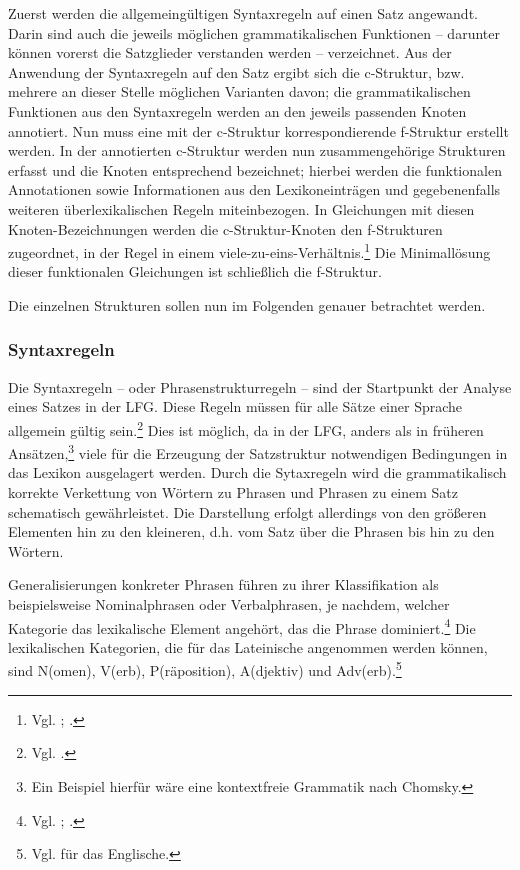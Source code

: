 \documentclass[12pt,a4paper]{article}
\begin{document}
Zuerst werden die allgemeingültigen Syntaxregeln auf einen Satz angewandt. Darin sind auch die jeweils möglichen grammatikalischen Funktionen -- darunter können vorerst die Satzglieder verstanden werden -- verzeichnet. Aus der Anwendung der Syntaxregeln auf den Satz ergibt sich die c-Struktur, bzw. mehrere an dieser Stelle möglichen Varianten davon; die grammatikalischen Funktionen aus den Syntaxregeln werden an den jeweils passenden Knoten annotiert. Nun muss eine mit der c-Struktur korrespondierende f-Struktur erstellt werden. In der annotierten c-Struktur werden nun zusammengehörige Strukturen erfasst und die Knoten entsprechend bezeichnet; hierbei werden die funktionalen Annotationen sowie Informationen aus den Lexikoneinträgen und gegebenenfalls weiteren überlexikalischen Regeln miteinbezogen. In Gleichungen mit diesen Knoten-Bezeichnungen werden die c-Struktur-Knoten den f-Strukturen zugeordnet, in der Regel in einem viele-zu-eins-Verhältnis.\footnote{Vgl. \cite[64]{Falk}; \cite[9]{Skript}.} Die Minimallösung dieser funktionalen Gleichungen ist schließlich die f-Struktur.

Die einzelnen Strukturen sollen nun im Folgenden genauer betrachtet werden.

\subsubsection{Syntaxregeln}
Die Syntaxregeln -- oder Phrasenstrukturregeln -- sind der Startpunkt der Analyse eines Satzes in der LFG. Diese Regeln müssen für alle Sätze einer Sprache allgemein gültig sein.\footnote{Vgl. \cite[47]{Dal}.} Dies ist möglich, da in der LFG, anders als in früheren Ansätzen,\footnote{Ein Beispiel hierfür wäre eine kontextfreie Grammatik nach Chomsky.} viele für die Erzeugung der Satzstruktur notwendigen Bedingungen in das Lexikon ausgelagert werden. Durch die Sytaxregeln wird die grammatikalisch korrekte Verkettung von Wörtern zu Phrasen und Phrasen zu einem Satz schematisch gewährleistet. Die Darstellung erfolgt allerdings von den größeren Elementen hin zu den kleineren, d.h. vom Satz über die Phrasen bis hin zu den Wörtern. 

Generalisierungen konkreter Phrasen führen zu ihrer Klassifikation als beispielsweise Nominalphrasen oder Verbalphrasen, je nachdem, welcher Kategorie das lexikalische Element angehört, das die Phrase dominiert.\footnote{Vgl. \cite[47; 53; 58-9]{Dal}; \cite[15]{Rohrer}.} Die lexikalischen Kategorien, die für das Lateinische angenommen werden können, sind N(omen), V(erb), P(räposition), A(djektiv) und Adv(erb).\footnote{Vgl. \cite[46; 52]{Dal} für das Englische.}
\end{document}
